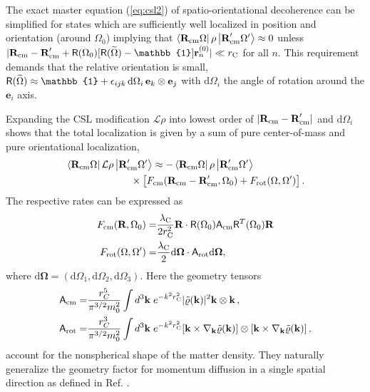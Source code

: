 \documentclass[%
 twocolumn,
 amsmath,amssymb,
 aps,
 pra,
]{revtex4-1}
\newcommand{\op}[1]{{\sf #1}}
\begin{document}
The exact master equation (\ref{eq:csl2}) of spatio-orientational decoherence can be simplified for states which are sufficiently well localized in position and orientation (around $\Omega_0$) implying that $\left<\textbf{R}_{\rm cm}\Omega\right|\rho\left|\textbf{R}_{\rm cm}'\Omega'\right>\approx 0$ unless $|\textbf{R}_{\rm cm}-\textbf{R}_{\rm cm}' +\op{R}(\Omega_0) [\op{R}(\widetilde{\Omega})-\mathbb{1}] \textbf{r}_n^{(0)}|\ll r_{\rm C}$ for all $n$. This requirement demands that the relative  orientation is small, $\op{R}(\widetilde{\Omega}) \approx \mathbb{1} + \epsilon_{ijk}\,\mathrm{d}\Omega_i\,\textbf{e}_k\otimes\textbf{e}_j$  with $\mathrm{d}\Omega_i$ the angle of rotation around the $\textbf{e}_i$ axis.

Expanding the CSL modification $\mathcal{L} \rho$ into lowest order of $|\textbf{R}_{\rm cm}-\textbf{R}_{\rm cm}'|$ and $\mathrm{d} \Omega_i$ shows that the total localization is given by a sum of  pure center-of-mass and pure orientational localization,
\begin{align}
&\left<\textbf{R}_{\rm cm}\Omega\right|\mathcal{L}\rho\left|\textbf{R}_{\rm cm}'\Omega'\right>
\approx - \left<\textbf{R}_{\rm cm}\Omega\right|\rho\left|\textbf{R}_{\rm cm}'\Omega'\right> \nonumber\\
&\hspace{23mm}\times \left[F_{\rm cm}(\textbf{R}_{\rm cm} - \textbf{R}'_{\rm cm},\Omega_0)+F_{\rm rot}(\Omega,\Omega')\right].
\end{align}  
The respective rates can be expressed as
\begin{subequations}\label{eq:loc2}
\begin{align} 
F_{\rm cm}(\textbf{R},\Omega_0)=&
\frac{\lambda_{\rm C}}{2r_{\rm C}^2}\textbf{R} \cdot
\op{R}(\Omega_0) \op{A}_{\rm cm} \op{R}^T(\Omega_0)\textbf{R}\\
F_{\rm rot}(\Omega,\Omega')=&
\frac{\lambda_{\rm C}}{2}\mathrm{d}\boldsymbol{\Omega} \cdot
\op{A}_{\rm rot}\mathrm{d}\boldsymbol{\Omega},
\end{align}
\end{subequations}
where $\mathrm{d} \boldsymbol{\Omega} = (\mathrm{d} \Omega_1,\mathrm{d} \Omega_2,\mathrm{d} \Omega_3)$. Here the  geometry tensors
\begin{subequations} \label{eq:geomtens}
\begin{align}
\op{A}_{\rm cm}=&\frac{r^5_C}{\pi^{3/2}m_0^2}\int d^3\textbf{k}\hspace{1mm}e^{-k^2r_{\rm C}^2}|\tilde{\varrho}(\textbf{k})|^2
\textbf{k}\otimes\textbf{k}\,,
\\
\op{A}_{\rm rot}=&\frac{r^3_C}{\pi^{3/2}m_0^2}\int d^3\textbf{k}\hspace{1mm}e^{-k^2r_{\rm C}^2} [\textbf{k}\times\nabla_{\textbf{k}}\tilde{\varrho}(\textbf{k})]\otimes[\textbf{k}\times\nabla_{\textbf{k}}\tilde{\varrho}(\textbf{k})]\,,
\end{align}
\end{subequations}
account for the nonspherical shape of the matter density. They
naturally generalize the geometry factor for momentum diffusion in a single spatial direction as defined in Ref. \cite{nimmrichter2014optomechanical}.
\end{document}
